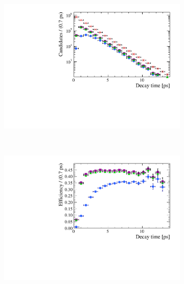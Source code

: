 \begin{figure}[tbp]
    \centering
   \begin{subfigure}[b]{0.48\textwidth}
        \includegraphics[width= \textwidth]{./Figs/LifetimeMeasurement/DT.pdf}
    \end{subfigure}
   ~ %
    \begin{subfigure}[b]{0.48\textwidth}
       \includegraphics[width=\textwidth]{./Figs/LifetimeMeasurement/Accpt.pdf}

\end{subfigure}
\end{figure}
